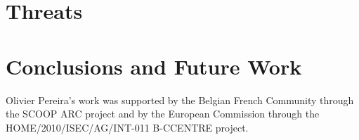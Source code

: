 \documentclass[jets]{usenixjournal}
\begin{document}
\section{Threats}


\section{Conclusions and Future Work}


\begin{acks}
  Olivier Pereira's work was supported by the Belgian French Community
  through the SCOOP ARC project and by the European Commission through
  the HOME/2010/ISEC/AG/INT-011 B-CCENTRE project.
\end{acks}



\end{document}
